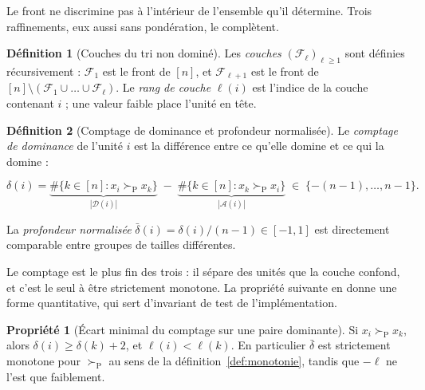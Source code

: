 \documentclass[11pt,a4paper]{article}
\theoremstyle{definition}
\newtheorem{definition}{Définition}[section]
\newtheorem{propriete}{Propriété}[section]
\theoremstyle{remark}
\newcommand{\abs}[1]{\left\lvert #1 \right\rvert}
\newcommand{\pareto}{\succ_{\mathrm{P}}}
\begin{document}
\bigskip

Le front ne discrimine pas à l'intérieur de l'ensemble qu'il détermine. Trois
raffinements, eux aussi sans pondération, le complètent.

\medskip

\begin{definition}[Couches du tri non dominé]
  \label{def:couches}
  Les \emph{couches} $(\mathcal{F}_\ell)_{\ell \ge 1}$ sont définies récursivement :
  $\mathcal{F}_1$ est le front de $[n]$, et $\mathcal{F}_{\ell+1}$ est le front de
  $[n] \setminus (\mathcal{F}_1 \cup \dots \cup \mathcal{F}_\ell)$. Le \emph{rang de
  couche} $\ell(i)$ est l'indice de la couche contenant $i$ ; une valeur faible place
  l'unité en tête.
\end{definition}

\bigskip

\begin{definition}[Comptage de dominance et profondeur normalisée]
  \label{def:comptage}
  Le \emph{comptage de dominance} de l'unité $i$ est la différence entre ce qu'elle
  domine et ce qui la domine :

  \medskip

  \[
    \delta(i) =
    \underbrace{\#\{k \in [n] : x_i \pareto x_k\}}_{\textstyle \abs{\mathcal{D}(i)}}
    \;-\;
    \underbrace{\#\{k \in [n] : x_k \pareto x_i\}}_{\textstyle \abs{\mathcal{A}(i)}}
    \;\in\; \{-(n-1),\dots,n-1\}.
  \]

  \bigskip

  La \emph{profondeur normalisée} $\bar{\delta}(i) = \delta(i)/(n-1) \in [-1,1]$ est
  directement comparable entre groupes de tailles différentes.
\end{definition}

\bigskip

Le comptage est le plus fin des trois : il sépare des unités que la couche confond, et
c'est le seul à être strictement monotone. La propriété suivante en donne une forme
quantitative, qui sert d'invariant de test de l'implémentation.

\medskip

\begin{propriete}[Écart minimal du comptage sur une paire dominante]
  \label{prop:comptage}
  Si $x_i \pareto x_k$, alors $\delta(i) \ge \delta(k) + 2$, et $\ell(i) < \ell(k)$. En
  particulier $\bar{\delta}$ est strictement monotone pour $\pareto$ au sens de la
  définition~\ref{def:monotonie}, tandis que $-\ell$ ne l'est que faiblement.
\end{propriete}
\end{document}
